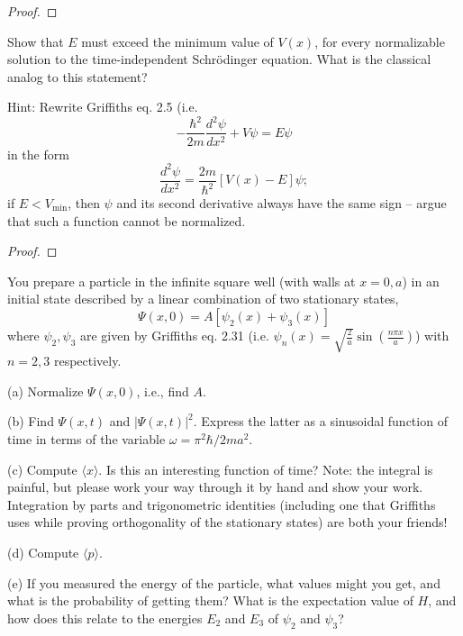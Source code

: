\documentclass{article}
\begin{document}
\begin{proof}
\end{proof}

\newpage

\begin{ques}\label{q3}
Show that $E$ must exceed the minimum value of $V(x)$, for every normalizable solution to
the time-independent Schrödinger equation. What is the classical analog to this statement?

Hint: Rewrite Griffiths eq. 2.5 (i.e.
\[
-\frac{\hbar^2}{2m}\frac{d^2\psi}{dx^2} + V\psi = E\psi
\]
in the form
\[
\frac{d^2\psi}{dx^2} = \frac{2m}{\hbar^2}[V(x) - E]\psi;
\]
if $E < V_{\min}$, then $\psi$ and its second derivative always have the same sign – argue that such
a function cannot be normalized.
\end{ques}

\begin{proof}
\end{proof}

\newpage

\begin{ques}\label{q4}
You prepare a particle in the infinite square well (with walls at $x = 0, a$) in an initial state
described by a linear combination of two stationary states,
\[
\Psi(x, 0) = A[\psi_2(x) + \psi_3(x)]
\]
where $\psi_2, \psi_3$ are given by Griffiths eq. 2.31 (i.e. $\psi_n(x) = \sqrt{\frac{2}{a}}\sin\left(\frac{n\pi x}{a}\right)$) with $n = 2, 3$
respectively.

(a) Normalize $\Psi(x, 0)$, i.e., find $A$.

(b) Find $\Psi(x, t)$ and $|\Psi(x, t)|^2$. Express the latter as a sinusoidal function of time in
terms of the variable $\omega = \pi^2\hbar / 2ma^2$.

(c) Compute $\langle x \rangle$. Is this an interesting function of time? Note: the integral is painful,
but please work your way through it by hand and show your work. Integration by
parts and trigonometric identities (including one that Griffiths uses while proving
orthogonality of the stationary states) are both your friends!

(d) Compute $\langle p \rangle$.

(e) If you measured the energy of the particle, what values might you get, and what is
the probability of getting them? What is the expectation value of $H$, and how does
this relate to the energies $E_2$ and $E_3$ of $\psi_2$ and $\psi_3$?
\end{ques}
\end{document}
